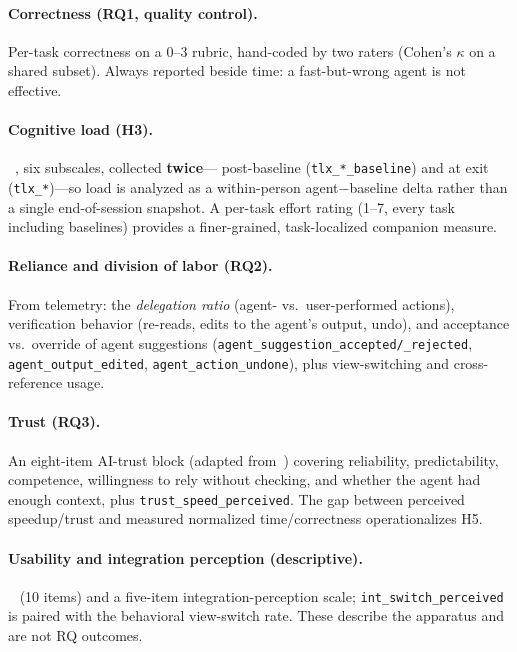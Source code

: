 \paragraph{Correctness (RQ1, quality control).}
Per-task correctness on a 0--3 rubric, hand-coded by two raters (Cohen's $\kappa$
on a shared subset). Always reported beside time: a fast-but-wrong agent is not
effective.

\paragraph{Cognitive load (H3).}
\NASATLX~\cite{hart1988tlx}, six subscales, collected \textbf{twice}---
post-baseline (\texttt{tlx\_*\_baseline}) and at exit (\texttt{tlx\_*})---so load
is analyzed as a within-person agent$-$baseline delta rather than a single
end-of-session snapshot. A per-task effort rating (1--7, every task including
baselines) provides a finer-grained, task-localized companion measure.

\paragraph{Reliance and division of labor (RQ2).}
From telemetry: the \emph{delegation ratio} (agent- vs.\ user-performed actions),
verification behavior (re-reads, edits to the agent's output, undo), and
acceptance vs.\ override of agent suggestions
(\texttt{agent\_suggestion\_accepted/\_rejected}, \texttt{agent\_output\_edited},
\texttt{agent\_action\_undone}), plus view-switching and cross-reference usage.

\paragraph{Trust (RQ3).}
An eight-item AI-trust block (adapted from~\cite{madsen2000measuring}) covering
reliability, predictability, competence, willingness to rely without checking,
and whether the agent had enough context, plus \texttt{trust\_speed\_perceived}.
The gap between perceived speedup/trust and measured normalized time/correctness
operationalizes H5.

\paragraph{Usability and integration perception (descriptive).}
\SUS~\cite{brooke1996sus} (10 items) and a five-item integration-perception
scale; \texttt{int\_switch\_perceived} is paired with the behavioral view-switch
rate. These describe the apparatus and are not RQ outcomes.

